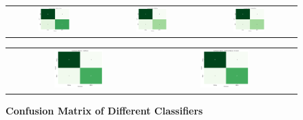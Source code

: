 \documentclass[pt]{article}  %
\begin{document}
\begin{figure}[H]
\begin{center}
\vspace{5pt} %

\begin{tabular}{c c c} %
    \includegraphics[width=0.35\textwidth]{confusion-matrix/rf.png} &
    \includegraphics[width=0.35\textwidth]{confusion-matrix/adaboost.png} &
    \includegraphics[width=0.35\textwidth]{confusion-matrix/gboost.png} \\
\end{tabular}

\vspace{5pt} %

\begin{tabular}{c c} %
    \includegraphics[width=0.35\textwidth]{confusion-matrix/catboost.png} &
    \includegraphics[width=0.35\textwidth]{confusion-matrix/ann.png} \\
\end{tabular}

\end{center}
    \caption{\textbf{Confusion Matrix of Different Classifiers}}
    \label{fig:con-figure} 
\end{figure}
\end{document}
